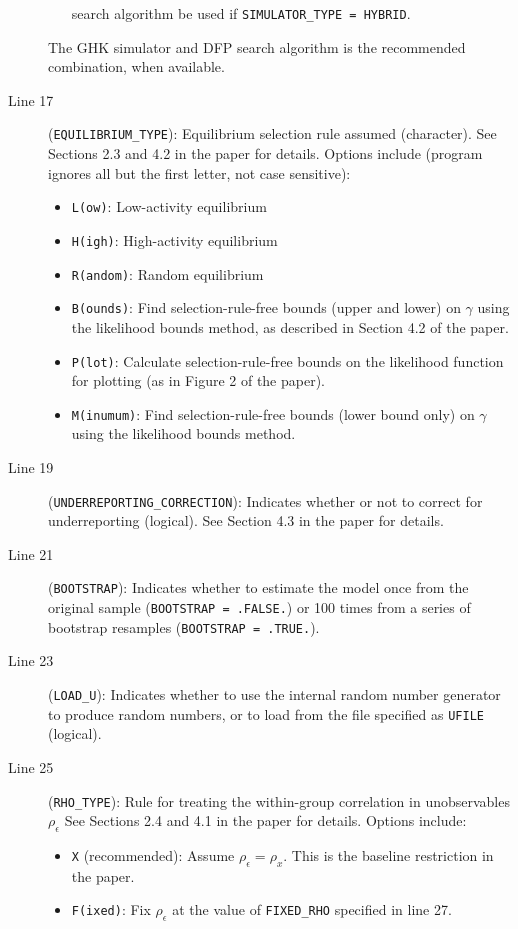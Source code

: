 \documentclass{article}
\begin{document}
\begin{description}
\begin{itemize}
			search algorithm be used if {\tt SIMULATOR\_{}TYPE = HYBRID}.
	\end{itemize}
	The GHK simulator and DFP search algorithm is the recommended combination, when available.
\item[Line 17] ({\tt EQUILIBRIUM\_{}TYPE}): Equilibrium selection rule assumed (character). See Sections
	2.3 and 4.2 in the paper for details.   Options include (program ignores all but 
	the first letter, not case sensitive):
	\begin{itemize}
		\item {\tt L(ow)}: Low-activity equilibrium
		\item {\tt H(igh)}: High-activity equilibrium
		\item {\tt R(andom)}: Random equilibrium
		\item {\tt B(ounds)}: Find selection-rule-free bounds (upper and lower) on $\gamma$ using 
			the likelihood bounds	method, as described in Section 4.2 of the paper.
		\item {\tt P(lot)}: Calculate selection-rule-free bounds on the likelihood function for 
			plotting (as in Figure 2 of the paper).
		\item {\tt M(inumum)}: Find selection-rule-free bounds (lower bound only) 
			on $\gamma$ using the likelihood bounds	method.
	\end{itemize}
\item[Line 19] ({\tt UNDERREPORTING\_{}CORRECTION}): Indicates whether or not to correct for underreporting (logical).  	See Section 4.3 in the paper for details.
\item[Line 21] ({\tt BOOTSTRAP}): Indicates whether to estimate the model once from the original sample 
	({\tt BOOTSTRAP = .FALSE.}) or 100 times from a series of bootstrap resamples ({\tt BOOTSTRAP = .TRUE.}).
\item[Line 23] ({\tt LOAD\_{}U}): Indicates whether to use the internal random number generator to produce 
	random numbers, or to load from the file specified as {\tt UFILE} (logical).  
\item[Line 25] ({\tt RHO\_{}TYPE}): Rule for treating the within-group correlation in unobservables $\rho_{\epsilon}$
	See Sections 2.4 and 4.1 in the paper for details. Options include:
	\begin{itemize}
		\item {\tt X} (recommended): Assume $\rho_{\epsilon}=\rho_x$.  This is the baseline
			restriction in the paper.
		\item {\tt F(ixed)}: Fix $\rho_{\epsilon}$ at the value of {\tt FIXED\_RHO} specified in line 27.

\end{itemize}
\end{description}
\end{document}
